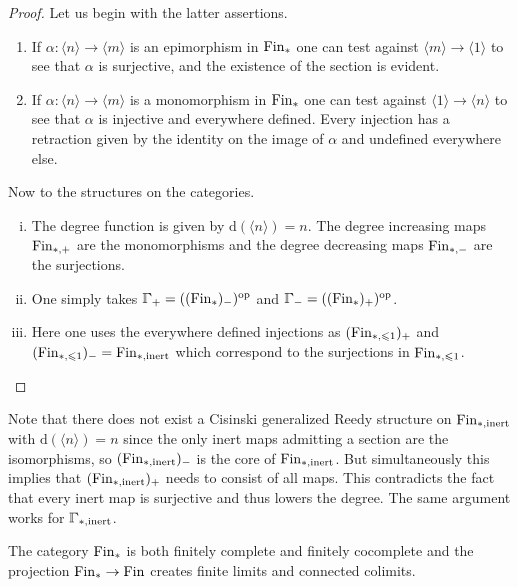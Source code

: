 \begin{proof}
Let us begin with the latter assertions.
\begin{enumerate}[(1)]
\item If $\alpha\colon\langle n\rangle\to\langle m\rangle$ is an epimorphism in $\mathrm{Fin}_\ast$
one can test against $\langle m\rangle\to\langle 1\rangle$ to see that $\alpha$ is surjective,
and the existence of the section is evident.
\item If $\alpha\colon\langle n\rangle\to\langle m\rangle$ is a monomorphism in $\mathrm{Fin}_\ast$
one can test against $\langle 1\rangle\to\langle n\rangle$ to see that $\alpha$ is injective and everywhere defined.
Every injection has a retraction given by the identity on the image of $\alpha$ and undefined everywhere else.
\end{enumerate}
Now to the structures on the categories.
\begin{enumerate}[(i)]
\item The degree function is given by $\mathrm{d}(\langle n\rangle) = n$.
The degree increasing maps $\mathrm{Fin}_{\ast,+}$ are the monomorphisms
and the degree decreasing maps $\mathrm{Fin}_{\ast,-}$ are the surjections.
\item One simply takes $\bbGamma_+ = ((\Fin_\ast)_-)^\op$ and $\bbGamma_- = ((\Fin_\ast)_+)^\op$.
\item Here one uses the everywhere defined injections as $(\mathrm{Fin}_{\ast,\leqslant 1})_+$ and $(\mathrm{Fin}_{\ast,\leqslant 1})_- = {\operatorname{Fin}_{\ast,\mathrm{inert}}}$ which correspond to the surjections in $\mathrm{Fin}_{\ast,\leqslant 1}$.\qedhere
\end{enumerate}
\end{proof}

\begin{remark}
Note that there does not exist a Cisinski generalized Reedy structure on ${\operatorname{Fin}_{\ast,\mathrm{inert}}}$ with $\mathrm{d}(\langle n\rangle) = n$
since the only inert maps admitting a section are the isomorphisms, so $({\operatorname{Fin}_{\ast,\mathrm{inert}}})_-$ is the core of ${\operatorname{Fin}_{\ast,\mathrm{inert}}}$.
But simultaneously this implies that $({\operatorname{Fin}_{\ast,\mathrm{inert}}})_+$ needs to consist of all maps.
This contradicts the fact that every inert map is surjective and thus lowers the degree.
The same argument works for $\inert$.
\end{remark}



\begin{lemma}\label{lem:fin-star-co-comp}
The category $\mathrm{Fin}_\ast$ is both finitely complete and finitely cocomplete
and the projection $\mathrm{Fin}_\ast\to\mathrm{Fin}$ creates finite limits and connected colimits.
\end{lemma}


